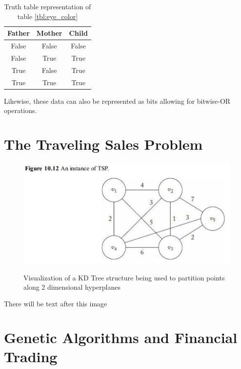 \documentclass{article}
\renewcommand{\_}{\ifincsname_\else\legacyunderscore\fi}
\begin{document}
    \begin{table}[h]
        \centering
        \begin{tabular}{|c|c|c|}
            \hline
            Father & Mother & Child \\
            \hline
            False  & False  & False \\
            \hline
            False  & True   & True \\
            \hline            
            True   & False  & True \\
            \hline
            True   & True   & True \\
            \hline
        \end{tabular}
        \caption{Truth table representation of table \ref{tbl:eye_color}}
        \label{tbl:eye_color_truth}
    \end{table}

    Likewise, these data can also be represented as bits allowing for bitwise-OR operations.
\newpage
\section*{The Traveling Sales Problem}
\begin{figure}[!h]
    \centering
    \includegraphics[width=\textwidth,keepaspectratio]{tsp.png}
    \label{fig:space_partition}
    \caption{Visualization of a KD Tree structure being used to partition points along 2 dimensional hyperplanes}
\end{figure}
There will be text after this image
\newpage
\section*{Genetic Algorithms and Financial Trading}
\end{document}
